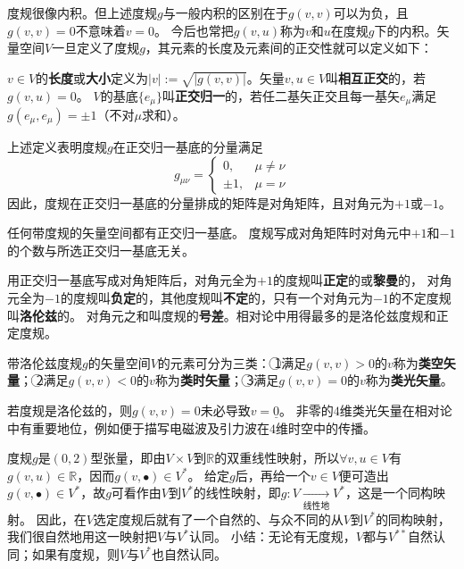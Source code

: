 度规很像内积。但上述度规$g$与一般内积的区别在于$g(v, v)$可以为负，且$g(v, v) = 0$不意味着$v = 0$。
今后也常把$g(v, u)$称为$v$和$u$在度规$g$下的内积。矢量空间$V$一旦定义了度规$g$，其元素的长度及元素间的正交性就可以定义如下：

\begin{definition}
$v \in V$的\textbf{长度}或\textbf{大小}定义为$|v| := \sqrt{|g(v, v)|}$。矢量$v, u \in V$叫\textbf{相互正交}的，若$g(v, u) = 0$。
$V$的基底$\{e_\mu\}$叫\textbf{正交归一}的，若任二基矢正交且每一基矢$e_\mu$满足$g(e_\mu, e_\mu) = \pm 1$（不对$\mu$求和）。
\end{definition}

\begin{note}
上述定义表明度规$g$在正交归一基底的分量满足
$$
g_{\mu\nu} =
\begin{cases}
0, & \mu \neq \nu \\
\pm 1, & \mu = \nu
\end{cases}
$$
因此，度规在正交归一基底的分量排成的矩阵是对角矩阵，且对角元为$+1$或$-1$。
\end{note}

\begin{theorem}
任何带度规的矢量空间都有正交归一基底。
度规写成对角矩阵时对角元中$+1$和$-1$的个数与所选正交归一基底无关。
\end{theorem}

\begin{definition}
用正交归一基底写成对角矩阵后，对角元全为$+1$的度规叫\textbf{正定}的或\textbf{黎曼}的，
对角元全为$-1$的度规叫\textbf{负定}的，其他度规叫\textbf{不定}的，只有一个对角元为$-1$的不定度规叫\textbf{洛伦兹}的。
对角元之和叫度规的\textbf{号差}。相对论中用得最多的是洛伦兹度规和正定度规。
\end{definition}

\begin{definition}
带洛伦兹度规$g$的矢量空间$V$的元素可分为三类：
\textcircled{1}满足$g(v, v) > 0$的$v$称为\textbf{类空矢量}；
\textcircled{2}满足$g(v, v) < 0$的$v$称为\textbf{类时矢量}；
\textcircled{3}满足$g(v, v) = 0$的$v$称为\textbf{类光矢量}。
\end{definition}

\begin{note}
若度规是洛伦兹的，则$g(v, v) = 0$未必导致$v = \underline{0}$。
非零的$4$维类光矢量在相对论中有重要地位，例如便于描写电磁波及引力波在$4$维时空中的传播。
\end{note}

度规$g$是$(0, 2)$型张量，即由$V \times V$到$\mathbb{R}$的双重线性映射，所以$\forall v, u \in V$有$g(v, u) \in \mathbb{R}$，因而$g(v, \bullet) \in V^*$。
给定$g$后，再给一个$v \in V$便可造出$g(v, \bullet) \in V^*$，故$g$可看作由$V$到$V^*$的线性映射，即$g \colon V \xrightarrow[\text{线性地}]{} V^*$，这是一个同构映射。
因此，在$V$选定度规后就有了一个自然的、与众不同的从$V$到$V^*$的同构映射，我们很自然地用这一映射把$V$与$V^*$认同。
小结：无论有无度规，$V$都与$V^{**}$自然认同；如果有度规，则$V$与$V^*$也自然认同。

